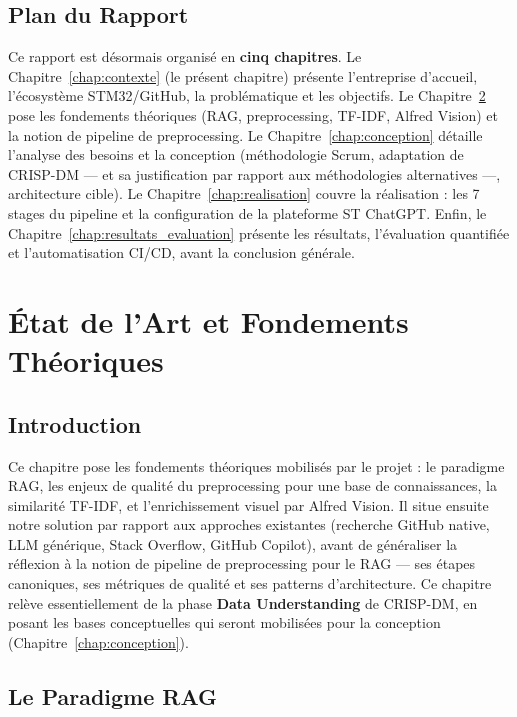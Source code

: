 \documentclass[12pt,a4paper]{report}
\begin{document}
\section{Plan du Rapport}

Ce rapport est désormais organisé en \textbf{cinq chapitres}. Le Chapitre~\ref{chap:contexte} (le présent chapitre) présente l'entreprise d'accueil, l'écosystème STM32/GitHub, la problématique et les objectifs. Le Chapitre~\ref{chap:etat_art} pose les fondements théoriques (RAG, preprocessing, TF-IDF, Alfred Vision) et la notion de pipeline de preprocessing. Le Chapitre~\ref{chap:conception} détaille l'analyse des besoins et la conception (méthodologie Scrum, adaptation de CRISP-DM --- et sa justification par rapport aux méthodologies alternatives ---, architecture cible). Le Chapitre~\ref{chap:realisation} couvre la réalisation : les 7 stages du pipeline et la configuration de la plateforme ST ChatGPT. Enfin, le Chapitre~\ref{chap:resultats_evaluation} présente les résultats, l'évaluation quantifiée et l'automatisation CI/CD, avant la conclusion générale.

\chapter{État de l'Art et Fondements Théoriques}
\label{chap:etat_art}

\section*{Introduction}

Ce chapitre pose les fondements théoriques mobilisés par le projet : le paradigme RAG, les enjeux de qualité du preprocessing pour une base de connaissances, la similarité TF-IDF, et l'enrichissement visuel par Alfred Vision. Il situe ensuite notre solution par rapport aux approches existantes (recherche GitHub native, LLM générique, Stack Overflow, GitHub Copilot), avant de généraliser la réflexion à la notion de pipeline de preprocessing pour le RAG --- ses étapes canoniques, ses métriques de qualité et ses patterns d'architecture. Ce chapitre relève essentiellement de la phase \textbf{Data Understanding} de CRISP-DM, en posant les bases conceptuelles qui seront mobilisées pour la conception (Chapitre~\ref{chap:conception}).

\section{Le Paradigme RAG}
\label{sec:etat_art}
\end{document}
